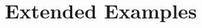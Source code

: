 \documentclass[main.tex]{subfiles}
\begin{document}
\section{Extended Examples}
\label{sec:extended_examples}
\end{document}
